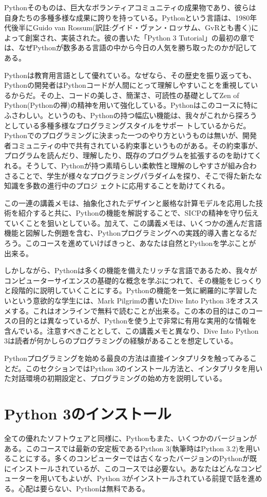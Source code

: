 \documentclass[letterpaper,10pt,dvipdfmx]{sphinxmanual}
\begin{document}
Pythonそのものは、巨大なボランティアコミュニティの成果物であり、彼らは自身たちの多種多様な成果に誇りを持っている。Pythonという言語は、1980年代後半にGuido van Rossum(訳註:グイド・ヴァン・ロッサム、GvRとも書く)によって創案され、実装された。彼の書いた「Python 3 Tutorial」の最初の章では、なぜPythonが数多ある言語の中から今日の人気を勝ち取ったのかが記してある。

Pythonは教育用言語として優れている。なぜなら、その歴史を振り返っても、Pythonの開発者はPythonコードが人間にとって理解しやすいことを重視しているからだ。その上、コードの美しさ、簡潔さ、可読性の基礎としてZen of Python(Pythonの禅)の精神を用いて強化している。Pythonはこのコースに特にふさわしい。というのも、Pythonの持つ幅広い機能は、我々がこれから探ろうとしている多種多様なプログラミングスタイルをサポー
トしているからだ。Pythonでのプログラミングに決まった一つのやり方というものは無いが、開発者コミュニティの中で共有されている約束事というものがある。その約束事が、プログラムを読んだり、理解したり、既存のプログラムを拡張するのを助けてくれる。そうして、Pythonが持つ素晴らしい柔軟性と理解のしやすさが組み合わさることで、学生が様々なプログラミングパラダイムを探り、そこで得た新たな知識を多数の進行中のプロジ
ェクトに応用することを助けてくれる。

この一連の講義メモは、抽象化されたデザインと厳格な計算モデルを応用した技術を紹介すると共に、Pythonの機能を解説することで、SICPの精神を守り伝えていくことを狙いとしている。加えて、この講義メモは、いくつかの進んだ言語機能と図解した例題を含む、Pythonプログラミングへの実践的導入書となるだろう。このコースを進めていけばきっと、あなたは自然とPythonを学ぶことが出来る。

しかしながら、Pythonは多くの機能を備えたリッチな言語であるため、我々がコンピューターサイエンスの基礎的な概念を学ぶにつれて、その機能をじっくりと段階的に説明していくことにする。Pythonの機能を一気に網羅的に学習したいという意欲的な学生には、Mark Pilgrimの書いたDive Into Python 3をオススメする。これはオンラインで無料で読むことが出来る。この本の目的はこのコースの目的とは異なっているが、Pythonを使う上で非常に有用な実用的な情報を含んでいる。注意すべきこととして、この講義メモと異なり、Dive Into Python 3は読者が何かしらのプログラミングの経験があることを想定している。

Pythonプログラミングを始める最良の方法は直接インタプリタを触ってみることだ。このセクションではPython 3のインストール方法と、インタプリタを用いた対話環境の初期設定と、プログラミングの始め方を説明している。


\section{Python 3のインストール}
\label{functions:python-3}
全ての優れたソフトウェアと同様に、Pythonもまた、いくつかのバージョンがある。このコースでは最新の安定板であるPython 3(執筆時はPython 3.2)を用いることにする。多くのコンピューターでは古くなったバージョンのPythonが既にインストールされているが、このコースでは必要ない。あなたはどんなコンピューターを用いてもよいが、Python 3がインストールされている前提で話を進める。心配は要らない、Pythonは無料である。
\end{document}
